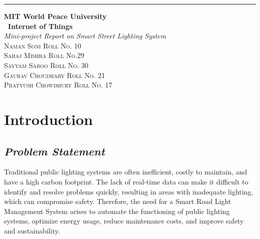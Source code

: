 \documentclass{article}
\begin{document}
\begin{titlepage} %
	
	\raggedleft\rule{1pt}{\textheight} %
	\hspace{0.05\textwidth} %
	\parbox[b]{0.75\textwidth}
	{ %
		
		{\Huge\bfseries MIT World Peace University \\[0.5\baselineskip] \ Internet of Things}\\[2\baselineskip] %
		{\large\textit{Mini-project Report on Smart Street Lighting System}}\\[4\baselineskip] %
		{\Large\textsc{Naman Soni Roll No. 10\\
        Sahaj Mishra Roll No.29\\
        Sayyam Saboo Roll No. 30\\
        Gaurav Choudhary Roll No. 21\\
        Pratyush Chowdhury Roll No. 17}} %
		
		\vspace{0.5\textheight} %
	}
	
\end{titlepage}
\tableofcontents
\pagebreak
\section{\textbf{Introduction}}
\subsection{\textit{Problem Statement}}
Traditional public lighting systems are often inefficient, costly to maintain, and have a high carbon footprint. The lack of real-time data can make it difficult to identify and resolve problems quickly, resulting in areas with inadequate lighting, which can compromise safety. Therefore, the need for a Smart Road Light Management System arises to automate the functioning of public lighting systems, optimize energy usage, reduce maintenance costs, and improve safety and sustainability.
\end{document}
